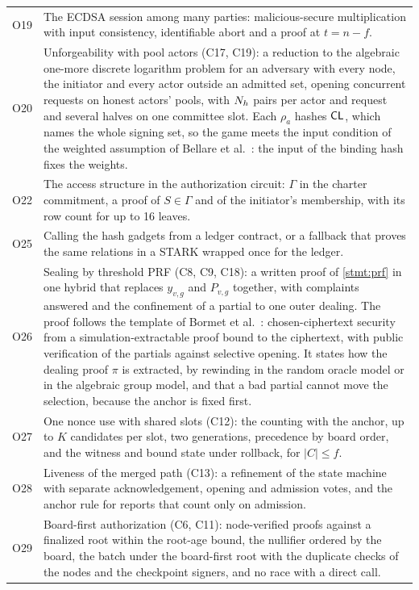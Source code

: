 {\begin{longtable}{@{}>{\raggedright\arraybackslash}p{0.8cm}>{\raggedright\arraybackslash}p{13.5cm}@{}}
O19 & The ECDSA session among many parties: malicious-secure multiplication with input consistency, identifiable abort and a proof at $t = n - f$. \\
O20 & Unforgeability with pool actors (C17, C19): a reduction to the algebraic one-more discrete logarithm problem for an adversary with every node, the initiator and every actor outside an admitted set, opening concurrent requests on honest actors' pools, with $N_{h}$ pairs per actor and request and several halves on one committee slot. Each $\rho_a$ hashes $\mathsf{CL}$, which names the whole signing set, so the game meets the input condition of the weighted assumption of Bellare et al.~\cite{BTA22}: the input of the binding hash fixes the weights. \\
O22 & The access structure in the authorization circuit: $\Gamma$ in the charter commitment, a proof of $S \in \Gamma$ and of the initiator's membership, with its row count for up to 16 leaves. \\
O25 & Calling the hash gadgets from a ledger contract, or a fallback that proves the same relations in a STARK wrapped once for the ledger. \\
O26 & Sealing by threshold PRF (C8, C9, C18): a written proof of \cref{stmt:prf} in one hybrid that replaces $y_{v,g}$ and $P_{v,g}$ together, with complaints answered and the confinement of a partial to one outer dealing. The proof follows the template of Bormet et al.~\cite[Theorem~5.1 and Section~6]{BEATMEV}: chosen-ciphertext security from a simulation-extractable proof bound to the ciphertext, with public verification of the partials against selective opening. It states how the dealing proof $\pi$ is extracted, by rewinding in the random oracle model or in the algebraic group model, and that a bad partial cannot move the selection, because the anchor is fixed first. \\
O27 & One nonce use with shared slots (C12): the counting with the anchor, up to $K$ candidates per slot, two generations, precedence by board order, and the witness and bound state under rollback, for $|C| \le f$. \\
O28 & Liveness of the merged path (C13): a refinement of the state machine with separate acknowledgement, opening and admission votes, and the anchor rule for reports that count only on admission. \\
O29 & Board-first authorization (C6, C11): node-verified proofs against a finalized root within the root-age bound, the nullifier ordered by the board, the batch under the board-first root with the duplicate checks of the nodes and the checkpoint signers, and no race with a direct call. \\

\end{longtable}}
